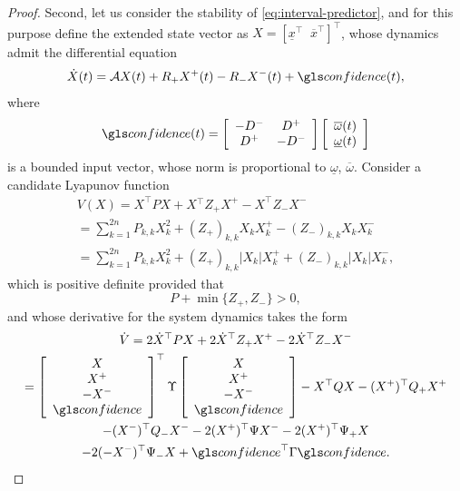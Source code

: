 \begin{proof}
	Second, let us consider the stability of \eqref{eq:interval-predictor}, and for this purpose define the extended state vector as $X=[\underline{x}^{\top}\;\;\overline{x}^{\top}]^{\top}$, whose dynamics admit the differential equation
	\[
	\dot{X}(t)=\mathcal{A}X(t)+R_{+}X^{+}(t)-R_{-}X^{-}(t)+\confidence(t),
	\]
	where
	\begin{gather*}
	\confidence(t)=\left[\begin{array}{cc}
	-D^{-} & D^{+}\\
	D^{+} & -D^{-}
	\end{array}\right]\left[\begin{array}{c}
	\overline{\omega}(t)\\
	\underline{\omega}(t)
	\end{array}\right]
	\end{gather*}
	is a bounded input vector, whose norm is proportional to $\underline{\omega}$,
	$\overline{\omega}$. Consider a candidate Lyapunov function
	\begin{gather*}
	V(X)=X^{\top}PX+X{}^{\top}Z_{+}X^{+}-X^{\top}Z_{-}X^{-}\\
	=\sum_{k=1}^{2n}P_{k,k}X_{k}^{2}+(Z_{+})_{k,k}X_{k}X_{k}^{+}-(Z_{-})_{k,k}X_{k}X_{k}^{-}\\
	=\sum_{k=1}^{2n}P_{k,k}X_{k}^{2}+(Z_{+})_{k,k}|X_{k}|X_{k}^{+}+(Z_{-})_{k,k}|X_{k}|X_{k}^{-},
	\end{gather*}
	which is positive definite provided that
	\[
	P+\min\{Z_{+},Z_{-}\}>0,
	\]
	and whose derivative for the system dynamics takes the form
	\begin{gather*}
	\dot{V}=2\dot{X}^{\top}PX+2\dot{X}^{\top}Z_{+}X^{+}-2\dot{X}^{\top}Z_{-}X^{-}\\
	=\left[\begin{array}{c}
	X\\
	X^{+}\\
	-X^{-}\\
	\confidence
	\end{array}\right]^{\top}\Upsilon\left[\begin{array}{c}
	X\\
	X^{+}\\
	-X^{-}\\
	\confidence
	\end{array}\right]-X^{\top}QX-(X^{+})^{\top}Q_{+}X^{+}\\
	-(X^{-})^{\top}Q_{-}X^{-}-2(X^{+})^{\top}\Psi X^{-}-2(X^{+})^{\top}\Psi_{+}X\\
	-2(-X^{-})^{\top}\Psi_{-}X+\confidence^{\top}\Gamma\confidence.
	\end{gather*}

\end{proof}
